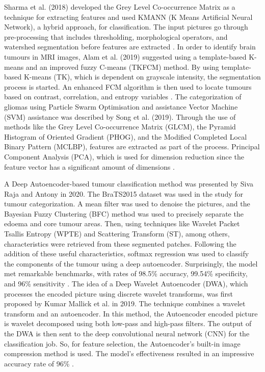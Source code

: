 \documentclass[12pt, a4paper,twoside]{report}
\theoremstyle{plain} %
\theoremstyle{definition} %
\theoremstyle{remark} %
\numberwithin{equation}{chapter}
\begin{document}
Sharma et al. (2018) developed the Grey Level Co-occurrence Matrix as a technique for extracting features and used KMANN (K Means Artificial Neural Network), a hybrid approach, for classification. The input pictures go through pre-processing that includes thresholding, morphological operators, and watershed segmentation before features are extracted \cite{sharma2018information}. 
In order to identify brain tumours in MRI images, Alam et al. (2019) suggested using a template-based K-means and an improved fuzzy C-means (TKFCM) method. By using template-based K-means (TK), which is dependent on grayscale intensity, the segmentation process is started. An enhanced FCM algorithm is then used to locate tumours based on contrast, correlation, and entropy variables \cite{alam2019automatic}. The categorization of gliomas using Particle Swarm Optimisation and assistance Vector Machine (SVM) assistance was described by Song et al. (2019). Through the use of methods like the Grey Level Co-occurrence Matrix (GLCM), the Pyramid Histogram of Oriented Gradient (PHOG), and the Modified Completed Local Binary Pattern (MCLBP), features are extracted as part of the process. Principal Component Analysis (PCA), which is used for dimension reduction since the feature vector has a significant amount of dimensions \cite{song2019noninvasive}.

A Deep Autoencoder-based tumour classification method was presented by Siva Raja and Antony in 2020. The BraTS2015 dataset was used in the study for tumour categorization. A mean filter was used to denoise the pictures, and the Bayesian Fuzzy Clustering (BFC) method was used to precisely separate the edoema and core tumour areas. Then, using techniques like Wavelet Packet Tsallis Entropy (WPTE) and Scattering Transform (ST), among others, characteristics were retrieved from these segmented patches. Following the addition of these useful characteristics, softmax regression was used to classify the components of the tumour using a deep autoencoder. Surprisingly, the model met remarkable benchmarks, with rates of 98.5\% accuracy, 99.54\% specificity, and 96\% sensitivity \cite{raja2020brain}. The idea of a Deep Wavelet Autoencoder (DWA), which processes the encoded picture using discrete wavelet transforms, was first proposed by Kumar Mallick et al. in 2019. The technique combines a wavelet transform and an autoencoder. In this method, the Autoencoder encoded picture is wavelet decomposed using both low-pass and high-pass filters. The output of the DWA is then sent to the deep convolutional neural network (CNN) for the classification job. So, for feature selection, the Autoencoder's built-in image compression method is used. The model's effectiveness resulted in an impressive accuracy rate of 96\% \cite{mallick2019brain}.
\end{document}
